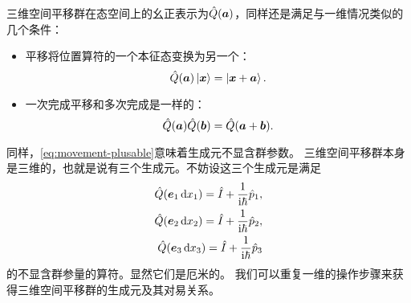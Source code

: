 \documentclass[hyperref, UTF8, a4paper]{ctexart}
\newcommand*{\ii}{\mathrm{i}}
\begin{document}
三维空间平移群在态空间上的幺正表示为$\hat{Q}(\vb*{a})$，同样还是满足与一维情况类似的几个条件：
\begin{itemize}
    \item 平移将位置算符的一个本征态变换为另一个：
    \begin{equation}
        \hat{Q}(\vb*{a}) \ket{\vb*{x}} = \ket{\vb*{x} + \vb*{a}}.
    \end{equation}
    \item 一次完成平移和多次完成是一样的：
    \begin{equation}
        \hat{Q}(\vb*{a}) \hat{Q}(\vb*{b}) = \hat{Q}(\vb*{a} + \vb*{b}).
        \label{eq:movement-plusable}
    \end{equation}
\end{itemize}
同样，\eqref{eq:movement-plusable}意味着生成元不显含群参数。
三维空间平移群本身是三维的，也就是说有三个生成元。不妨设这三个生成元是满足
\begin{equation}
    \begin{split}
        \hat{Q}(\vb*{e}_1 \dd{x_1}) = \hat{I} + \frac{1}{\ii \hbar} \hat{p}_1, \\
        \hat{Q}(\vb*{e}_2 \dd{x_2}) = \hat{I} + \frac{1}{\ii \hbar} \hat{p}_2, \\
        \hat{Q}(\vb*{e}_3 \dd{x_3}) = \hat{I} + \frac{1}{\ii \hbar} \hat{p}_3
    \end{split} 
\end{equation}
的不显含群参量的算符。显然它们是厄米的。
我们可以重复一维的操作步骤来获得三维空间平移群的生成元及其对易关系。
\end{document}
